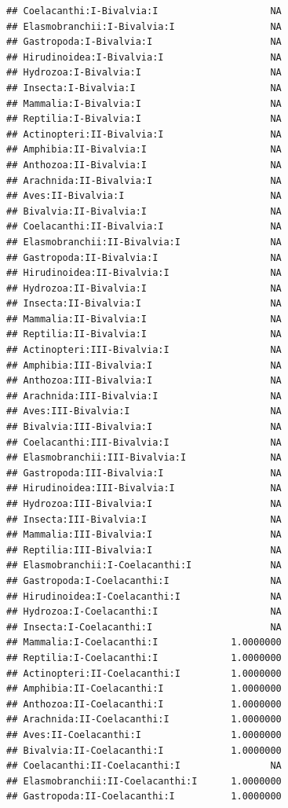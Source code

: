 \documentclass[
  12pt,
]{article}
\begin{document}
\begin{verbatim}
## Coelacanthi:I-Bivalvia:I                    NA
## Elasmobranchii:I-Bivalvia:I                 NA
## Gastropoda:I-Bivalvia:I                     NA
## Hirudinoidea:I-Bivalvia:I                   NA
## Hydrozoa:I-Bivalvia:I                       NA
## Insecta:I-Bivalvia:I                        NA
## Mammalia:I-Bivalvia:I                       NA
## Reptilia:I-Bivalvia:I                       NA
## Actinopteri:II-Bivalvia:I                   NA
## Amphibia:II-Bivalvia:I                      NA
## Anthozoa:II-Bivalvia:I                      NA
## Arachnida:II-Bivalvia:I                     NA
## Aves:II-Bivalvia:I                          NA
## Bivalvia:II-Bivalvia:I                      NA
## Coelacanthi:II-Bivalvia:I                   NA
## Elasmobranchii:II-Bivalvia:I                NA
## Gastropoda:II-Bivalvia:I                    NA
## Hirudinoidea:II-Bivalvia:I                  NA
## Hydrozoa:II-Bivalvia:I                      NA
## Insecta:II-Bivalvia:I                       NA
## Mammalia:II-Bivalvia:I                      NA
## Reptilia:II-Bivalvia:I                      NA
## Actinopteri:III-Bivalvia:I                  NA
## Amphibia:III-Bivalvia:I                     NA
## Anthozoa:III-Bivalvia:I                     NA
## Arachnida:III-Bivalvia:I                    NA
## Aves:III-Bivalvia:I                         NA
## Bivalvia:III-Bivalvia:I                     NA
## Coelacanthi:III-Bivalvia:I                  NA
## Elasmobranchii:III-Bivalvia:I               NA
## Gastropoda:III-Bivalvia:I                   NA
## Hirudinoidea:III-Bivalvia:I                 NA
## Hydrozoa:III-Bivalvia:I                     NA
## Insecta:III-Bivalvia:I                      NA
## Mammalia:III-Bivalvia:I                     NA
## Reptilia:III-Bivalvia:I                     NA
## Elasmobranchii:I-Coelacanthi:I              NA
## Gastropoda:I-Coelacanthi:I                  NA
## Hirudinoidea:I-Coelacanthi:I                NA
## Hydrozoa:I-Coelacanthi:I                    NA
## Insecta:I-Coelacanthi:I                     NA
## Mammalia:I-Coelacanthi:I             1.0000000
## Reptilia:I-Coelacanthi:I             1.0000000
## Actinopteri:II-Coelacanthi:I         1.0000000
## Amphibia:II-Coelacanthi:I            1.0000000
## Anthozoa:II-Coelacanthi:I            1.0000000
## Arachnida:II-Coelacanthi:I           1.0000000
## Aves:II-Coelacanthi:I                1.0000000
## Bivalvia:II-Coelacanthi:I            1.0000000
## Coelacanthi:II-Coelacanthi:I                NA
## Elasmobranchii:II-Coelacanthi:I      1.0000000
## Gastropoda:II-Coelacanthi:I          1.0000000

\end{verbatim}
\end{document}
